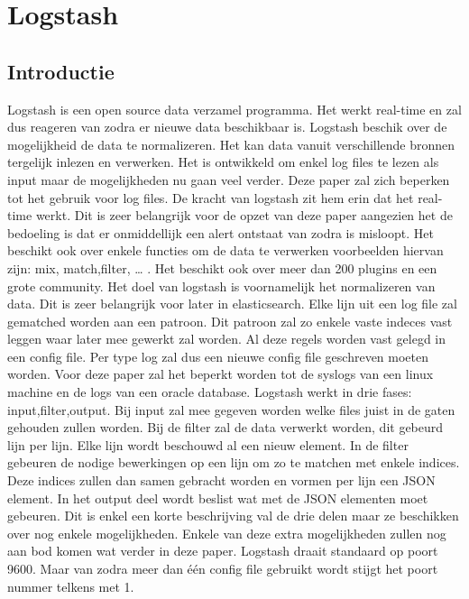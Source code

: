 
\chapter{Logstash}
\label{ch:logstash}


\section{Introductie}
\label{sec:logstash-introductie}

Logstash is een open source data verzamel programma. Het werkt real-time en zal dus reageren van zodra er nieuwe data beschikbaar is.  Logstash beschik over de mogelijkheid de data te normalizeren.  Het kan data vanuit verschillende bronnen tergelijk inlezen en verwerken. 
Het is ontwikkeld om enkel log files te lezen als input maar de mogelijkheden nu gaan veel verder.
Deze paper zal zich beperken tot het gebruik voor log files. 
De kracht van logstash zit hem erin dat het real-time werkt. Dit is zeer belangrijk voor de opzet van deze paper aangezien het de bedoeling is dat er onmiddellijk een alert ontstaat van zodra is misloopt. Het beschikt ook over enkele functies om de data te verwerken voorbeelden hiervan zijn: mix, match,filter, … .  
Het beschikt ook over meer dan 200 plugins en een grote community.
Het doel van logstash is voornamelijk het normalizeren van data. Dit is zeer belangrijk voor later in elasticsearch. Elke lijn uit een log file zal gematched worden aan een patroon. Dit patroon zal zo enkele vaste indeces vast leggen waar later mee gewerkt zal worden.
Al deze regels worden vast gelegd in een config file. Per type log zal dus een nieuwe config file geschreven moeten worden. Voor deze paper zal het beperkt worden tot de syslogs van een linux machine en de logs van een oracle database.
Logstash werkt in drie fases: input,filter,output. Bij input zal mee gegeven worden welke files juist in de gaten gehouden zullen worden. Bij de filter zal de data verwerkt worden, dit gebeurd lijn per lijn. Elke lijn wordt beschouwd al een nieuw element. In de filter gebeuren de nodige bewerkingen op een lijn om zo te matchen met enkele indices. Deze indices zullen dan samen gebracht worden en vormen per lijn een JSON element. In het output deel wordt beslist wat met de JSON elementen moet gebeuren.  
Dit is enkel een korte beschrijving val de drie delen maar ze beschikken over nog enkele mogelijkheden. Enkele van deze extra mogelijkheden zullen nog aan bod komen wat verder in deze paper. 
Logstash draait standaard op poort 9600. Maar van zodra meer dan één config file gebruikt wordt stijgt het poort nummer telkens met 1. 

